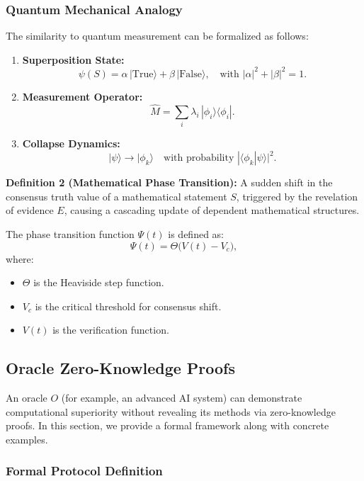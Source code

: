 \documentclass[11pt]{article}
\begin{document}
\subsubsection{Quantum Mechanical Analogy}

The similarity to quantum measurement can be formalized as follows:
\begin{enumerate}[label=(\arabic*)]
    \item \textbf{Superposition State:} 
    \[
    \psi(S) = \alpha\,| \text{True} \rangle + \beta\,| \text{False} \rangle, \quad \text{with } |\alpha|^2 + |\beta|^2 = 1.
    \]
    \item \textbf{Measurement Operator:} 
    \[
    \hat{M} = \sum_i \lambda_i \, |\phi_i\rangle\langle \phi_i|.
    \]
    \item \textbf{Collapse Dynamics:} 
    \[
    |\psi\rangle \to |\phi_k\rangle \quad \text{with probability } |\langle\phi_k|\psi\rangle|^2.
    \]
\end{enumerate}

\noindent
\textbf{Definition 2 (Mathematical Phase Transition):} A sudden shift in the consensus truth value of a mathematical statement $S$, triggered by the revelation of evidence $E$, causing a cascading update of dependent mathematical structures.

The phase transition function $\Psi(t)$ is defined as:
\[
\Psi(t) = \Theta\bigl(V(t)-V_c\bigr),
\]
where:
\begin{itemize}
    \item $\Theta$ is the Heaviside step function.
    \item $V_c$ is the critical threshold for consensus shift.
    \item $V(t)$ is the verification function.
\end{itemize}

\subsection{Oracle Zero-Knowledge Proofs}

An oracle $O$ (for example, an advanced AI system) can demonstrate computational superiority without revealing its methods via zero-knowledge proofs. In this section, we provide a formal framework along with concrete examples.

\subsubsection{Formal Protocol Definition}
\end{document}
